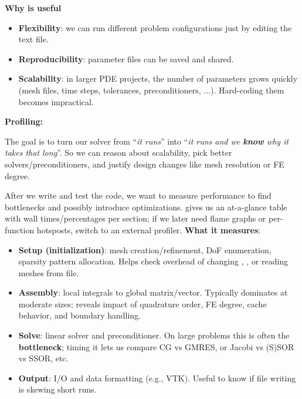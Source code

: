 \newpage

\begin{flushleft}
    \textcolor{Green3}{ \textbf{Why  is useful}}
\end{flushleft}
\begin{itemize}
    \item \textbf{Flexibility}: we can run different problem configurations just by editing the text file.
    \item \textbf{Reproducibility}: parameter files can be saved and shared.
    \item \textbf{Scalability}: in larger PDE projects, the number of parameters grows quickly (mesh files, time steps, tolerances, preconditioners, ...). Hard-coding them becomes impractical.
\end{itemize}

\highspace
\begin{flushleft}
    \textcolor{Green3}{\faIcon{\speedIcon} \textbf{Profiling: }}
\end{flushleft}
The goal is to turn our solver from ``\emph{it runs}'' into ``\emph{it runs and we \textbf{know} why it takes that long}''. So we can reason about scalability, pick better solvers/preconditioners, and justify design changes like mesh resolution or FE degree.

\highspace
After we write and test the code, we want to measure performance to find bottlenecks and possibly introduce optimizations.  gives us an at-a-glance table with wall times/percentages per section; if we later need flame graphs or per-function hotsposts, switch to an external profiler. \textbf{What it measures}:
\begin{itemize}
    \item \textbf{Setup (initialization)}: mesh creation/refinement, DoF enumeration, sparsity pattern allocation. Helps check overhead of changing , , or reading meshes from file.
    \item \textbf{Assembly}: local integrals to global matrix/vector. Typically dominates at moderate sizes; reveals impact of quadrature order, FE degree, cache behavior, and boundary handling.
    \item \textbf{Solve}: linear solver and preconditioner. On large problems this is often the \textbf{bottleneck}; timing it lets us compare CG vs GMRES, or Jacobi vs (S)SOR vs SSOR, etc.
    \item \textbf{Output}:  I/O and data formatting (e.g., VTK). Useful to know if file writing is skewing short runs.
\end{itemize}


